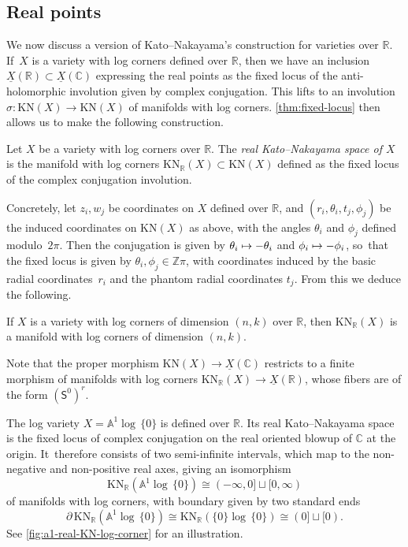 \documentclass[10pt]{amsart}
\newcommand\mto{\mathchoice{\longmapsto}{\mapsto}{\mapsto}{\mapsto}}
\theoremstyle{definition}
\theoremstyle{remark}
\newenvironment{example}
  {\pushQED{\qed}\renewcommand{\qedsymbol}{$\lozenge$}\examplex}
  {\popQED\endexamplex}
\let\defn\emph
\newcommand{\CC}{\mathbb{C}}
\newcommand{\RR}{\mathbb{R}}
\newcommand{\ZZ}{\mathbb{Z}}
\newcommand{\AF}{\mathbb{A}}
\newcommand{\logcyl}{\AF^1 \log\, \{0\}}
\newcommand{\logcirc}{\{0\} \log\, \{0\}}
\newcommand{\rbrac}[1]{\left(#1\right)}
\newcommand{\uX}{\underline{X}}
\newcommand{\KN}[1]{\mathrm{KN}(#1)}
\newcommand{\KNR}[1]{\mathrm{KN}_\RR\rbrac{#1}}
\begin{document}
\subsection{Real points}\label{sec:real-KN} We now discuss a version of Kato--Nakayama's construction for varieties over $\RR$. If~$X$ is a variety with log corners defined over $\RR$, then we have an inclusion $\uX(\RR)\subset \uX(\CC)$ expressing the real points as the fixed locus of the anti-holomorphic involution given by complex conjugation. This lifts to an involution $\sigma \colon \KN{X} \to \KN{X}$ of manifolds with log corners. \autoref{thm:fixed-locus} then allows us to make the following construction.

\begin{definition}
Let $X$ be a variety with log corners over $\RR$. The \defn{real Kato--Nakayama space of $X$} is the manifold with log corners $\KNR{X} \subset \KN{X}$ defined as the fixed locus of the complex conjugation involution.
\end{definition}

Concretely, let $z_i,w_j$ be coordinates on $X$ defined over $\RR$, and $(r_i,\theta_i,t_j,\phi_j)$ be the induced coordinates on $\KN{X}$ as above, with the angles $\theta_i$ and $\phi_j$ defined modulo~$2\pi$. Then the conjugation is given by $\theta_i \mto - \theta_i$ and $\phi_i \mto -\phi_i$, so~that the fixed locus is given by $\theta_i,\phi_j \in \ZZ\pi$, with coordinates induced by the basic radial coordinates~$r_i$ and the phantom radial coordinates $t_j$. From this we deduce the following.

\begin{corollary}
If $X$ is a variety with log corners of dimension $(n,k)$ over $\RR$, then $\KNR{X}$ is a manifold with log corners of dimension $(n,k)$.
\end{corollary}

Note that the proper morphism $\KN{X}\to \uX(\CC)$ restricts to a finite morphism of manifolds with log corners $\KNR{X}\to \uX(\RR)$, whose fibers are of the form $(\mathsf{S}^0)^r$.

\begin{example}
The log variety $X = \logcyl$ is defined over $\RR$. Its real Kato--Nakayama space is the fixed locus of complex conjugation on the real oriented blowup of $\CC$ at the origin. It~therefore consists of two semi-infinite intervals, which map to the non-negative and non-positive real axes, giving an isomorphism
\[
\KNR{\logcyl} \cong (-\infty,0] \sqcup [0,\infty)
\]
of manifolds with log corners, with boundary given by two standard ends
\[
\partial\,\KNR{\logcyl} \cong \KNR{\logcirc} \cong (0] \sqcup [0).
\]
See \autoref{fig:a1-real-KN-log-corner} for an illustration.
\end{example}
\end{document}
